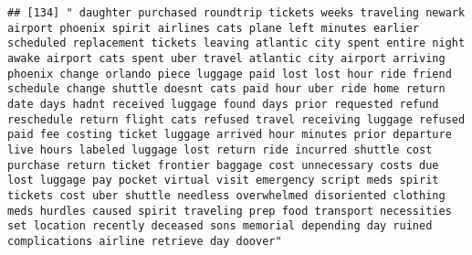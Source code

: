 \documentclass[
]{article}
\begin{document}
\begin{verbatim}
## [134] " daughter purchased roundtrip tickets weeks traveling newark airport phoenix spirit airlines cats plane left minutes earlier scheduled replacement tickets leaving atlantic city spent entire night awake airport cats spent uber travel atlantic city airport arriving phoenix change orlando piece luggage paid lost lost hour ride friend schedule change shuttle doesnt cats paid hour uber ride home return date days hadnt received luggage found days prior requested refund reschedule return flight cats refused travel receiving luggage refused paid fee costing ticket luggage arrived hour minutes prior departure live hours labeled luggage lost return ride incurred shuttle cost purchase return ticket frontier baggage cost unnecessary costs due lost luggage pay pocket virtual visit emergency script meds spirit tickets cost uber shuttle needless overwhelmed disoriented clothing meds hurdles caused spirit traveling prep food transport necessities set location recently deceased sons memorial depending day ruined complications airline retrieve day doover"                                                                                                                                                                                                                                                                                                                                                                                                                                                                                                                                                                                                                                                                                                  

\end{verbatim}
\end{document}
